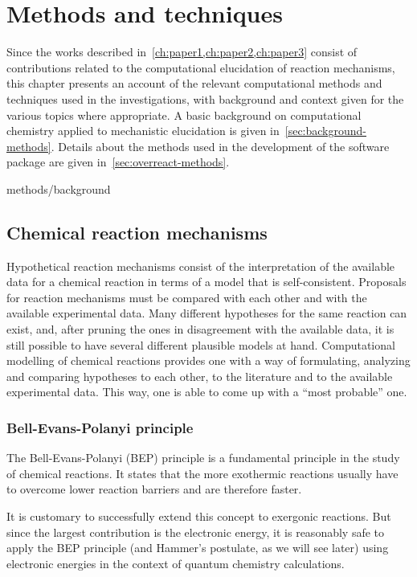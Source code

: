 \chapter{Methods and techniques}%
\label{ch:methods}

Since the works described in~\cref{ch:paper1,ch:paper2,ch:paper3} consist
of contributions related to the computational elucidation of reaction mechanisms,
this chapter presents an account of the relevant computational methods and
techniques used in the investigations,
with background and context given
for the various topics where appropriate.
A basic background on computational chemistry applied
to mechanistic elucidation is given in~\cref{sec:background-methods}.
Details about the methods used in the development of the \overreact software
package are given in~\cref{sec:overreact-methods}.

{methods/background}

\section{Chemical reaction mechanisms}

Hypothetical reaction mechanisms consist of
the interpretation of the available data for a chemical reaction
in terms of a model that is self-consistent.
Proposals for reaction mechanisms must be compared
with each other
and with the available experimental data.
Many different hypotheses for the same reaction can exist,
and,
after pruning the ones in disagreement with the available data,
it is still possible to have several different plausible models at hand.
Computational modelling of chemical reactions
provides one with a way of
formulating,
analyzing and
comparing hypotheses to each other,
to the literature and to the available experimental data.
This way,
one is able to come up with a ``most probable'' one.

\subsection{Bell-Evans-Polanyi principle}

The Bell-Evans-Polanyi (BEP) principle is a fundamental principle in the study
of chemical reactions.
It states that the more exothermic reactions usually have to overcome lower
reaction barriers and are therefore faster.


It is customary to successfully extend this concept to exergonic reactions.
But since the largest contribution is the electronic energy,
it is reasonably
safe to apply the BEP principle (and Hammer's postulate,
as we will see later)
using electronic energies in the context of quantum chemistry calculations.


